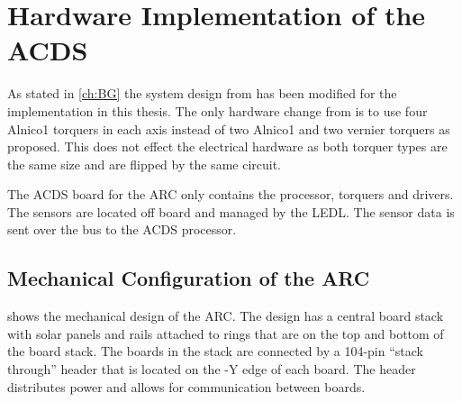 
\chapter{Hardware Implementation of the \acf*{ACDS}}\label{ch:CubeSatHardware}

As stated in \cref{ch:BG} the system design from \cite{Mentch11} has been modified for the implementation in this thesis. The only hardware change from \cite{Mentch11} is to use four Alnico1 torquers in each axis instead of two Alnico1 and two vernier torquers as proposed. This does not effect the electrical hardware as both torquer types are the same size and are flipped by the same circuit.

The \ac{ACDS} board for the \ac{ARC} only contains the processor, torquers and drivers. The sensors are located off board and managed by the \ac{LEDL}. The sensor data is sent over the bus to the \ac{ACDS} processor. 


\section{Mechanical Configuration of the \acf*{ARC}}

 shows the mechanical design of the \ac{ARC}. The design has a central board stack with solar panels and rails attached to rings that are on the top and bottom of the board stack. The boards in the stack are connected by a 104-pin \enquote{stack through} header that is located on the -Y edge of each board. The header distributes power and allows for communication between boards. 

